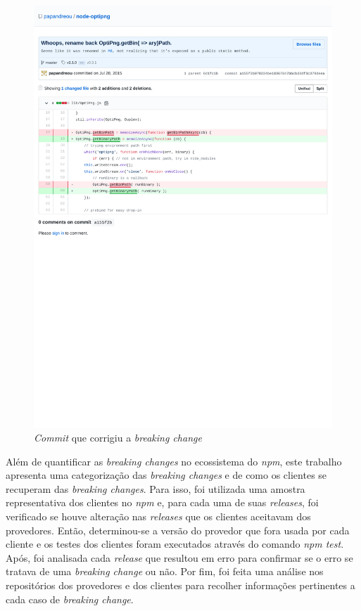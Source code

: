 \begin{figure}
    \centering
    \includegraphics[scale=0.65]{figuras/bc_example.pdf}
    \caption{\textit{Commit} que corrigiu a \textit{breaking change}}
    \label{fig:bc_optipng}
\end{figure}{}

Além de quantificar as \textit{breaking changes} no ecossistema do \textit{npm}, este trabalho apresenta uma categorização das \textit{breaking changes} e de como os clientes se recuperam das \textit{breaking changes}. Para isso, foi utilizada uma amostra representativa dos clientes no \textit{npm} e, para cada uma de suas \textit{releases}, foi verificado se houve alteração nas \textit{releases} que os clientes aceitavam dos provedores. Então, determinou-se a versão do provedor que fora usada por cada cliente e os testes dos clientes foram executados através do comando \textit{npm test}. Após, foi analisada cada \textit{release} que resultou em erro para confirmar se o erro se tratava de uma \textit{breaking change} ou não. Por fim, foi feita uma análise nos repositórios dos provedores e dos clientes para recolher informações pertinentes a cada caso de \textit{breaking change}.

